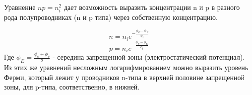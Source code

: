 Уравнение $np = n_i^2$ дает возможность выразить концентрации n и p в разного рода полупроводниках (n и p типа) через собственную концентрацию.

\begin{equation}
\label{eq:conc_dep} n = n_i e^{-\frac{\phi_E - \phi_F}{\phi_t}}
\end{equation}
\begin{equation}
p = n_i e^{-\frac{\phi_F - \phi_E}{\phi_t}}
\end{equation}
Где $\phi_E = \frac{\phi_c + \phi_v}{2}$ - середина запрещенной зоны (электростатический потенциал).\\
Из этих же уравнений несложным логарифмированием можно выразить уровень Ферми, который лежит у проводников n-типа в верхней половине запрещенной зоны, для p-типа, соответственно, в нижней.\\



